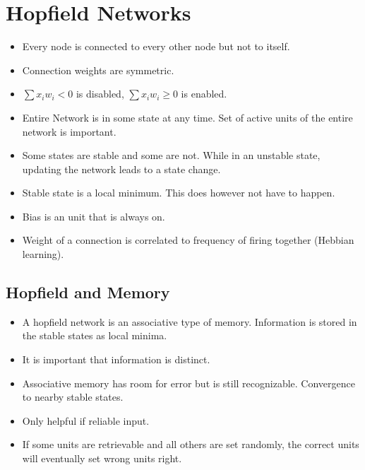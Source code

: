 \documentclass[a4paper, 12pt]{article}
\begin{document}
\section{Hopfield Networks}
\begin{itemize}[noitemsep,nolistsep]
	\item Every node is connected to every other node but not to itself.
	\item Connection weights are symmetric.
	\item $\sum x_iw_i < 0$ is disabled, $\sum x_iw_i \geq 0$ is enabled.
	\item Entire Network is in some state at any time. Set of active units of the entire network is important.
	\item Some states are stable and some are not. While in an unstable state, updating the network leads to a state change.
	\item Stable state is a local minimum. This does however not have to happen.
	\item Bias is an unit that is always on.
	\item Weight of a connection is correlated to frequency of firing together (Hebbian learning).
\end{itemize}

\subsection{Hopfield and Memory}
\begin{itemize}[noitemsep,nolistsep]
	\item A hopfield network is an associative type of memory. Information is stored in the stable states as local minima.
	\item It is important that information is distinct.
	\item Associative memory has room for error but is still recognizable. Convergence to nearby stable states.
	\item Only helpful if reliable input.
	\item If some units are retrievable and all others are set randomly, the correct units will eventually set wrong units right.
\end{itemize}
\end{document}
